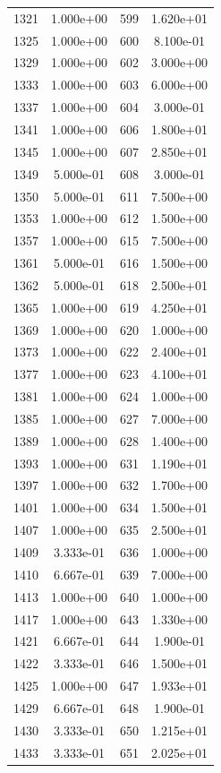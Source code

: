 \documentclass[12pt]{article}
\begin{document}
\begin{longtable}{@{}cccc@{}}
1321 & 1.000e+00 & 599 & 1.620e+01 \\
1325 & 1.000e+00 & 600 & 8.100e-01 \\
1329 & 1.000e+00 & 602 & 3.000e+00 \\
1333 & 1.000e+00 & 603 & 6.000e+00 \\
1337 & 1.000e+00 & 604 & 3.000e-01 \\
1341 & 1.000e+00 & 606 & 1.800e+01 \\
1345 & 1.000e+00 & 607 & 2.850e+01 \\
1349 & 5.000e-01 & 608 & 3.000e-01 \\
1350 & 5.000e-01 & 611 & 7.500e+00 \\
1353 & 1.000e+00 & 612 & 1.500e+00 \\
1357 & 1.000e+00 & 615 & 7.500e+00 \\
1361 & 5.000e-01 & 616 & 1.500e+00 \\
1362 & 5.000e-01 & 618 & 2.500e+01 \\
1365 & 1.000e+00 & 619 & 4.250e+01 \\
1369 & 1.000e+00 & 620 & 1.000e+00 \\
1373 & 1.000e+00 & 622 & 2.400e+01 \\
1377 & 1.000e+00 & 623 & 4.100e+01 \\
1381 & 1.000e+00 & 624 & 1.000e+00 \\
1385 & 1.000e+00 & 627 & 7.000e+00 \\
1389 & 1.000e+00 & 628 & 1.400e+00 \\
1393 & 1.000e+00 & 631 & 1.190e+01 \\
1397 & 1.000e+00 & 632 & 1.700e+00 \\
1401 & 1.000e+00 & 634 & 1.500e+01 \\
1407 & 1.000e+00 & 635 & 2.500e+01 \\
1409 & 3.333e-01 & 636 & 1.000e+00 \\
1410 & 6.667e-01 & 639 & 7.000e+00 \\
1413 & 1.000e+00 & 640 & 1.000e+00 \\
1417 & 1.000e+00 & 643 & 1.330e+00 \\
1421 & 6.667e-01 & 644 & 1.900e-01 \\
1422 & 3.333e-01 & 646 & 1.500e+01 \\
1425 & 1.000e+00 & 647 & 1.933e+01 \\
1429 & 6.667e-01 & 648 & 1.900e-01 \\
1430 & 3.333e-01 & 650 & 1.215e+01 \\
1433 & 3.333e-01 & 651 & 2.025e+01 \\

\end{longtable}
\end{document}
